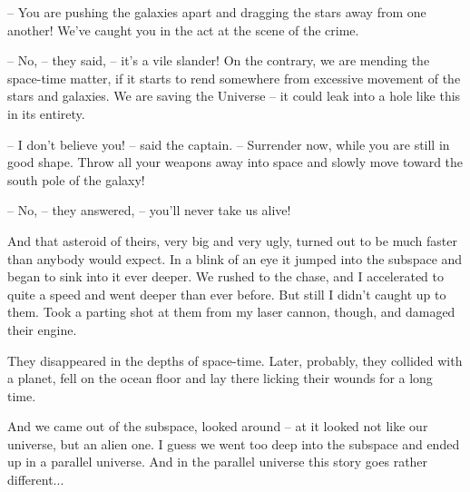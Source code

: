 \documentclass[ebook,twoside,final,openright]{memoir}
\begin{document}
– You are pushing the galaxies apart and dragging the stars away from one another! We’ve caught you in the act at the scene of the crime.\par
– No, – they said, – it’s a vile slander! On the contrary, we are mending the space-time matter, if it starts to rend somewhere from excessive movement of the stars and galaxies. We are saving the Universe – it could leak into a hole like this in its entirety.\par
– I don’t believe you! – said the captain. – Surrender now, while you are still in good shape. Throw all your weapons away into space and slowly move toward the south pole of the galaxy!\par
– No, – they answered, – you’ll never take us alive!\par
And that asteroid of theirs, very big and very ugly, turned out to be much faster than anybody would expect. In a blink of an eye it jumped into the subspace and began to sink into it ever deeper. We rushed to the chase, and I accelerated to quite a speed and went deeper than ever before. But still I didn’t caught up to them. Took a parting shot at them from my laser cannon, though, and damaged their engine.\par
They disappeared in the depths of space-time. Later, probably, they collided with a planet, fell on the ocean floor and lay there licking their wounds for a long time.\par
And we came out of the subspace, looked around – at it looked not like our universe, but an alien one. I guess we went too deep into the subspace and ended up in a parallel universe. And in the parallel universe this story goes rather different...
\end{document}
